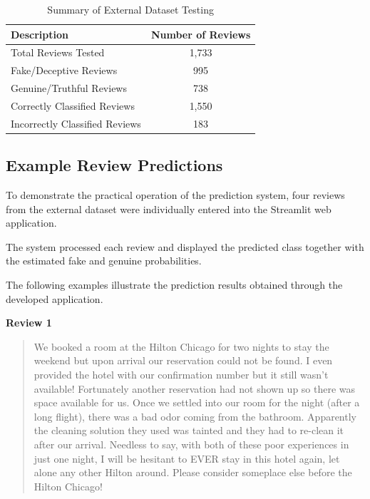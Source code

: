 \documentclass[12pt,a4paper]{report}
\begin{document}
\begin{table}[H]
\centering
\caption{Summary of External Dataset Testing}
\label{tab:external_testing_summary}

\begin{tabular}{|l|c|}
\hline
\textbf{Description} & \textbf{Number of Reviews} \\ \hline
Total Reviews Tested & 1,733 \\ \hline
Fake/Deceptive Reviews & 995 \\ \hline
Genuine/Truthful Reviews & 738 \\ \hline
Correctly Classified Reviews & 1,550 \\ \hline
Incorrectly Classified Reviews & 183 \\ \hline
\end{tabular}
\end{table}

\subsection{Example Review Predictions}

To demonstrate the practical operation of the
prediction system, four reviews from the external
dataset were individually entered into the
Streamlit web application.

The system processed each review and displayed
the predicted class together with the estimated
fake and genuine probabilities.

The following examples illustrate the prediction
results obtained through the developed application.

\vspace{0.3cm}
\noindent\textbf{Review 1}

\begin{quote}
We booked a room at the Hilton Chicago for two nights to stay the
weekend but upon arrival our reservation could not be found. I even
provided the hotel with our confirmation number but it still wasn't
available! Fortunately another reservation had not shown up so there
was space available for us. Once we settled into our room for the
night (after a long flight), there was a bad odor coming from the
bathroom. Apparently the cleaning solution they used was tainted and
they had to re-clean it after our arrival. Needless to say, with both
of these poor experiences in just one night, I will be hesitant to
EVER stay in this hotel again, let alone any other Hilton around.
Please consider someplace else before the Hilton Chicago!
\end{quote}
\end{document}
